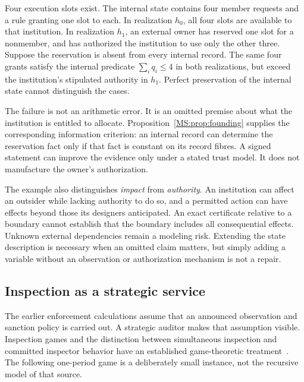\begin{MScounterexample}\label{MS:ex:external-claim}
Four execution slots exist. The internal state contains four member requests and a rule granting one slot to each. In realization $h_0$, all four slots are available to that institution. In realization $h_1$, an external owner has reserved one slot for a nonmember, and has authorized the institution to use only the other three. Suppose the reservation is absent from every internal record. The same four grants satisfy the internal predicate $\sum_iq_i\le4$ in both realizations, but exceed the institution's stipulated authority in $h_1$. Perfect preservation of the internal state cannot distinguish the cases.
\end{MScounterexample}

The failure is not an arithmetic error. It is an omitted premise about what the institution is entitled to allocate. Proposition~\ref{MS:prop:founding} supplies the corresponding information criterion: an internal record can determine the reservation fact only if that fact is constant on its record fibres. A signed statement can improve the evidence only under a stated trust model. It does not manufacture the owner's authorization.

The example also distinguishes \emph{impact} from \emph{authority}. An institution can affect an outsider while lacking authority to do so, and a permitted action can have effects beyond those its designers anticipated. An exact certificate relative to a boundary cannot establish that the boundary includes all consequential effects. Unknown external dependencies remain a modeling risk. Extending the state description is necessary when an omitted claim matters, but simply adding a variable without an observation or authorization mechanism is not a repair.

\subsection{Inspection as a strategic service}\label{MS:sec:strategic-auditor}

The earlier enforcement calculations assume that an announced observation and sanction policy is carried out. A strategic auditor makes that assumption visible. Inspection games and the distinction between simultaneous inspection and committed inspector behavior have an established game-theoretic treatment~\cite{MS:stengelinspection}. The following one-period game is a deliberately small instance, not the recursive model of that source.

